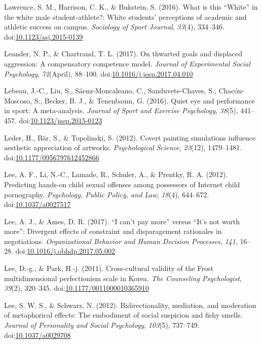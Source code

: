 \documentclass[english,man]{apa6}
\begin{document}
\hypertarget{ref-Lawrence2016}{}
Lawrence, S. M., Harrison, C. K., \& Bukstein, S. (2016). What is this
``White'' in the white male student-athlete?: White students'
perceptions of academic and athletic success on campus. \emph{Sociology
of Sport Journal}, \emph{33}(4), 334--346.
doi:\href{https://doi.org/10.1123/ssj.2015-0139}{10.1123/ssj.2015-0139}

\hypertarget{ref-Leander2017}{}
Leander, N. P., \& Chartrand, T. L. (2017). On thwarted goals and
displaced aggression: A compensatory competence model. \emph{Journal of
Experimental Social Psychology}, \emph{72}(April), 88--100.
doi:\href{https://doi.org/10.1016/j.jesp.2017.04.010}{10.1016/j.jesp.2017.04.010}

\hypertarget{ref-Lebeau2016}{}
Lebeau, J.-C., Liu, S., Sáenz-Moncaleano, C., Sanduvete-Chaves, S.,
Chacón-Moscoso, S., Becker, B. J., \& Tenenbaum, G. (2016). Quiet eye
and performance in sport: A meta-analysis. \emph{Journal of Sport and
Exercise Psychology}, \emph{38}(5), 441--457.
doi:\href{https://doi.org/10.1123/jsep.2015-0123}{10.1123/jsep.2015-0123}

\hypertarget{ref-Leder2012}{}
Leder, H., Bär, S., \& Topolinski, S. (2012). Covert painting
simulations influence aesthetic appreciation of artworks.
\emph{Psychological Science}, \emph{23}(12), 1479--1481.
doi:\href{https://doi.org/10.1177/0956797612452866}{10.1177/0956797612452866}

\hypertarget{ref-Lee2012b}{}
Lee, A. F., Li, N.-C., Lamade, R., Schuler, A., \& Prentky, R. A.
(2012). Predicting hands-on child sexual offenses among possessors of
Internet child pornography. \emph{Psychology, Public Policy, and Law},
\emph{18}(4), 644--672.
doi:\href{https://doi.org/10.1037/a0027517}{10.1037/a0027517}

\hypertarget{ref-Lee2017}{}
Lee, A. J., \& Ames, D. R. (2017). ``I can't pay more'' versus ``It's
not worth more'': Divergent effects of constraint and disparagement
rationales in negotiations. \emph{Organizational Behavior and Human
Decision Processes}, \emph{141}, 16--28.
doi:\href{https://doi.org/10.1016/j.obhdp.2017.05.002}{10.1016/j.obhdp.2017.05.002}

\hypertarget{ref-Lee2011}{}
Lee, D.-g., \& Park, H.-j. (2011). Cross-cultural validity of the Frost
multidimensional perfectionism scale in Korea. \emph{The Counseling
Psychologist}, \emph{39}(2), 320--345.
doi:\href{https://doi.org/10.1177/0011000010365910}{10.1177/0011000010365910}

\hypertarget{ref-Lee2012}{}
Lee, S. W. S., \& Schwarz, N. (2012). Bidirectionality, mediation, and
moderation of metaphorical effects: The embodiment of social suspicion
and fishy smells. \emph{Journal of Personality and Social Psychology},
\emph{103}(5), 737--749.
doi:\href{https://doi.org/10.1037/a0029708}{10.1037/a0029708}
\end{document}
